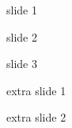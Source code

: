 \documentclass{beamer}
\begin{document}
\begin{frame}
    slide 1
\end{frame}

\begin{frame}
slide 2
\end{frame}

\begin{frame}
slide 3
\end{frame}

\appendix %

\begin{frame}
extra slide 1
\end{frame}

\begin{frame}
extra slide 2
\end{frame}
\end{document}
